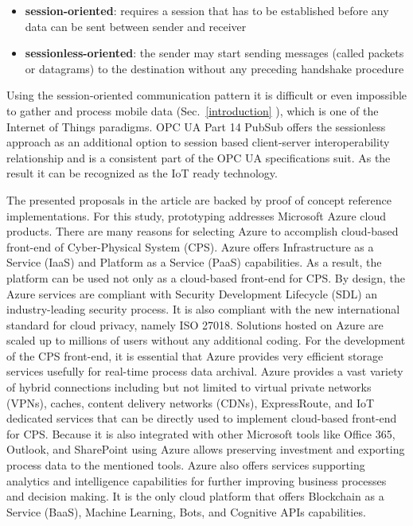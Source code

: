 \documentclass{jacsart}
\providecommand{\tightlist} { \setlength{\itemsep}{0pt}\setlength{\parskip}{0pt}}
\begin{document}
\begin{itemize}
      \tightlist
      \item \textbf{session-oriented}: requires a session that has to be established before any data can be sent between sender and receiver
      \item \textbf{sessionless-oriented}: the sender may start sending messages (called packets or datagrams) to the destination without any preceding handshake procedure
\end{itemize}

Using the session-oriented communication pattern it is difficult or even impossible to gather and process mobile data (Sec.~\ref*{introduction} ), which is one of the Internet of Things paradigms. OPC UA Part 14 PubSub \cite{RefWorks:doc:5d98837de4b055984c0eecf0}  offers the sessionless approach as an additional option to session based client-server interoperability relationship and is a consistent part of the OPC UA specifications suit. As the result it can be recognized as the IoT ready technology.

The presented proposals in the article are backed by proof of concept reference implementations. For this study, prototyping addresses Microsoft Azure cloud products. There are many reasons for selecting Azure to accomplish cloud-based front-end of Cyber-Physical System (CPS). Azure offers Infrastructure as a Service (IaaS) and Platform as a Service (PaaS) capabilities. As a result, the platform can be used not only as a cloud-based front-end for CPS. By design, the Azure services are compliant with Security Development Lifecycle (SDL) an industry-leading security process. It is also compliant with the new international standard for cloud privacy, namely ISO 27018. Solutions hosted on Azure are scaled up to millions of users without any additional coding. For the development of the CPS front-end, it is essential that Azure provides very efficient storage services usefully for real-time process data archival. Azure provides a vast variety of hybrid connections including but not limited to virtual private networks (VPNs), caches, content delivery networks (CDNs), ExpressRoute, and IoT dedicated services that can be directly used to implement cloud-based front-end for CPS. Because it is also integrated with other Microsoft tools like Office 365, Outlook, and SharePoint using Azure allows preserving investment and exporting process data to the mentioned tools. Azure also offers services supporting analytics and intelligence capabilities for further improving business processes and decision making. It is the only cloud platform that offers Blockchain as a Service (BaaS), Machine Learning, Bots, and Cognitive APIs capabilities.
\end{document}
